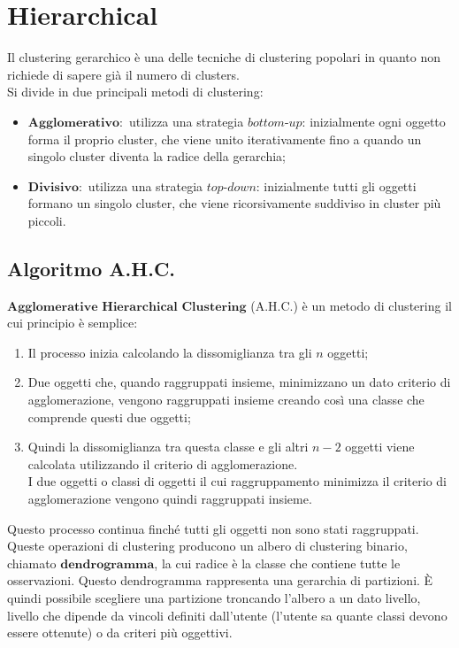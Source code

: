 \section{Hierarchical}
	Il clustering gerarchico è una delle tecniche di clustering popolari in quanto non richiede di sapere già il numero di clusters.
	\\[1\baselineskip]
	Si divide in due principali metodi di clustering:
		\begin{itemize}
			\item $\textbf{Agglomerativo}:$ utilizza una strategia $\textit{bottom-up}$:
				inizialmente ogni oggetto forma il proprio cluster, che viene unito iterativamente fino a quando un singolo cluster diventa la radice della gerarchia;

			\item $\textbf{Divisivo}:$ utilizza una strategia $\textit{top-down}$: 
				inizialmente tutti gli oggetti formano un singolo cluster, che viene ricorsivamente suddiviso in cluster più piccoli.
		\end{itemize}

	\clearpage

	\subsection{Algoritmo A.H.C.}
		$\textbf{Agglomerative Hierarchical Clustering}$ (A.H.C.) è un metodo di clustering il cui principio è semplice:
			\begin{enumerate}
				\item Il processo inizia calcolando la dissomiglianza tra gli $n$ oggetti;
				\item Due oggetti che, quando raggruppati insieme, minimizzano un dato criterio di agglomerazione, vengono raggruppati insieme creando così una classe che comprende questi due oggetti;
				\item Quindi la dissomiglianza tra questa classe e gli altri $n-2$ oggetti viene calcolata utilizzando il criterio di agglomerazione.
					\\
					I due oggetti o classi di oggetti il cui raggruppamento minimizza il criterio di agglomerazione vengono quindi raggruppati insieme.
			\end{enumerate}

			Questo processo continua finché tutti gli oggetti non sono stati raggruppati.
			\\[1\baselineskip]
			Queste operazioni di clustering producono un albero di clustering binario, chiamato $\textbf{dendrogramma}$, la cui radice è la classe che contiene tutte le osservazioni.
			Questo dendrogramma rappresenta una gerarchia di partizioni.
			È quindi possibile scegliere una partizione troncando l'albero a un dato livello, livello che dipende da vincoli definiti dall'utente (l'utente sa quante classi devono essere ottenute) o da criteri più oggettivi.

